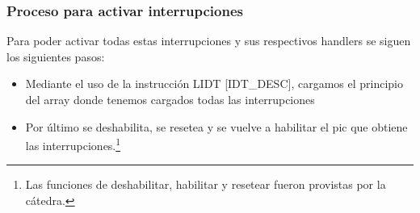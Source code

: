 \subsubsection{Proceso para activar interrupciones}

Para poder activar todas estas interrupciones y sus respectivos handlers se siguen los siguientes pasos:\\
\begin{itemize}
 \item Mediante el uso de la instrucci\'on LIDT [IDT\_DESC], cargamos el principio del array donde tenemos cargados todas las interrupciones
 \item Por \'ultimo se deshabilita, se resetea y se vuelve a habilitar el pic que obtiene las interrupciones.\footnote{Las funciones de 
deshabilitar, habilitar y resetear fueron provistas por la c\'atedra.}
\end{itemize}
